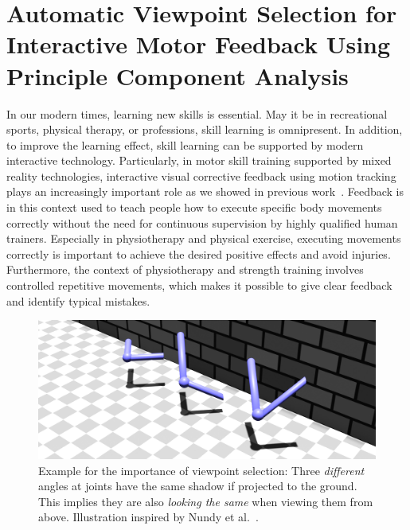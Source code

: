 
\chapter{Automatic Viewpoint Selection for Interactive Motor Feedback Using Principle Component Analysis\label{sec:introduction}}
In our modern times, learning new skills is essential. May it be in recreational sports, physical therapy, or professions, skill learning is omnipresent. In addition, to improve the learning effect, skill learning can be supported by modern interactive technology. Particularly, in motor skill training supported by mixed reality technologies, interactive visual corrective feedback using motion tracking plays an increasingly important role as we showed in previous work~\cite{diller2022vcb}. Feedback is in this context used to teach people how to execute specific body movements correctly without the need for continuous supervision by highly qualified human trainers. Especially in physiotherapy and physical exercise, executing movements correctly is important to achieve the desired positive effects and avoid injuries. Furthermore, the context of physiotherapy and strength training involves controlled repetitive movements, which makes it possible to give clear feedback and identify typical mistakes. 

\begin{figure}[t!]
	\centering
	\includegraphics[width=\linewidth]{pictures/projection_normal.png}
	\caption{Example for the importance of viewpoint selection: Three \emph{different} angles at joints have the same shadow if projected to the ground. This implies they are also \emph{looking the same} when viewing them from above. Illustration inspired by Nundy et al.~\cite{nundy2000wam}.}
	\label{fig:projection_normal}
\end{figure}

